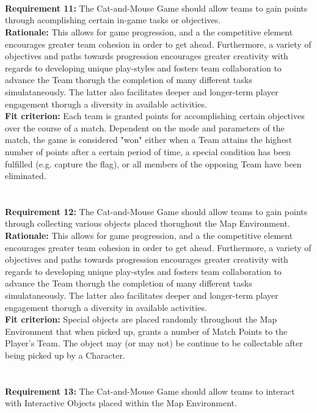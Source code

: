 \documentclass[12pt, titlepage]{article}
\begin{document}
\\
\\
\\ \textbf{Requirement 11:}  The Cat-and-Mouse Game should allow teams to gain points through acomplishing certain in-game tasks or objectives.\\
\textbf{Rationale:}  This allows for game progression, and a the competitive element encourages greater team cohesion in order to get ahead. Furthermore, a variety of objectives and paths towards progression encourages greater creativity with regards to developing unique play-styles and fosters team collaboration to advance the Team thorugh the completion of many different tasks simulataneously. The latter also facilitates deeper and longer-term player engagement thorugh a diversity in available activities.\\
\textbf{Fit criterion:}  Each team is granted points for accomplishing certain objectives over the course of a match. Dependent on the mode and parameters of the match, the game is considered "won" either when a Team attains the highest number of points after a certain period of time, a special condition has been fulfilled (e.g. capture the flag), or all members of the opposing Team have been eliminated.  
\\
\\
\\ \textbf{Requirement 12:}  The Cat-and-Mouse Game should allow teams to gain points through collecting various objects placed thorughout the Map Environment.\\
\textbf{Rationale:}  This allows for game progression, and a the competitive element encourages greater team cohesion in order to get ahead. Furthermore, a variety of objectives and paths towards progression encourages greater creativity with regards to developing unique play-styles and fosters team collaboration to advance the Team thorugh the completion of many different tasks simulataneously. The latter also facilitates deeper and longer-term player engagement thorugh a diversity in available activities.\\
\textbf{Fit criterion:}  Special objects are placed randomly throughout the Map Environment that when picked up, grants a number of Match Points to the Player's Team. The object may (or may not) be continue to be collectable after being picked up by a Character. 
\\
\\
\\ \textbf{Requirement 13:}  The Cat-and-Mouse Game should allow teams to interact with Interactive Objects placed within the Map Environment.\\
\end{document}
